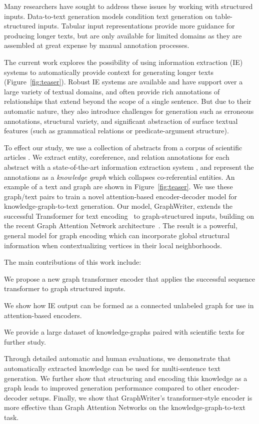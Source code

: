 \documentclass[11pt,a4paper]{article}
\begin{document}
Many researchers have sought to address these issues by working with structured inputs. 
Data-to-text generation models \cite{konstas-lapata:2013:EMNLP,lebret2016neural,wiseman2017challenges,puduppully2019data} condition text generation on table-structured inputs. 
Tabular input representations provide more guidance for producing longer texts, but are only available for limited domains as they are assembled at great expense by manual annotation processes. 


The current work explores the possibility of using information extraction (IE) systems to automatically provide context for generating longer texts (Figure~\ref{fig:teaser}). 
Robust IE systems are available and have support over a large variety of textual domains, and often provide rich annotations of relationships that extend beyond the scope of a single sentence.
But due to their automatic nature, they also introduce challenges for generation such as erroneous annotations, structural variety, and significant abstraction of surface textual features (such as grammatical relations or predicate-argument structure).

To effect our study, we use a collection of abstracts from a corpus of scientific articles \cite{ammar:18}.
We extract entity, coreference, and relation annotations for each abstract with a state-of-the-art information extraction system \cite{luan2018multi}, and represent the annotations as a {\it knowledge graph} which collapses co-referential entities. 
An example of a text and graph are shown in Figure~\ref{fig:teaser}.
We use these graph/text pairs to train a novel attention-based encoder-decoder model for knowledge-graph-to-text generation. 
Our model, GraphWriter, extends the successful Transformer for text encoding~\cite{vaswani2017attention} to graph-structured inputs, building on the recent Graph Attention Network architecture~\cite{velickovic2017graph}. 
The result is a powerful, general model for graph encoding which can incorporate global structural information when contextualizing vertices in their local neighborhoods. 


The main contributions of this work include:
\begin{compactenum}
    \item We propose a new graph transformer encoder that applies the successful sequence transformer to graph structured inputs. 
    \item We show how IE output can be formed as a connected unlabeled graph for use in attention-based encoders. 
    \item We provide a large dataset of knowledge-graphs paired with scientific texts for further study.
\end{compactenum}
Through detailed automatic and human evaluations, we demonstrate that automatically extracted knowledge can be used for multi-sentence text generation. 
We further show that structuring and encoding this knowledge as a graph leads to improved generation performance compared to other encoder-decoder setups. 
Finally, we show that GraphWriter's transformer-style encoder is more effective than Graph Attention Networks on the knowledge-graph-to-text task. 
\end{document}
